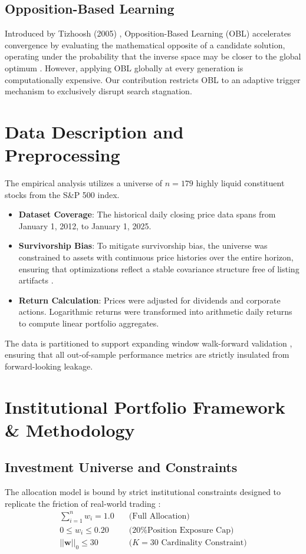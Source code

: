 \documentclass[11pt,a4paper]{article}
\begin{document}
\subsection{Opposition-Based Learning}
Introduced by Tizhoosh (2005) \cite{tizhoosh2005}, Opposition-Based Learning (OBL) accelerates convergence by evaluating the mathematical opposite of a candidate solution, operating under the probability that the inverse space may be closer to the global optimum \cite{rahnamayan2008, chiam2008}. However, applying OBL globally at every generation is computationally expensive. Our contribution restricts OBL to an adaptive trigger mechanism to exclusively disrupt search stagnation.

\section{Data Description and Preprocessing}
The empirical analysis utilizes a universe of $n = 179$ highly liquid constituent stocks from the S\&P 500 index. 
\begin{itemize}
    \item \textbf{Dataset Coverage}: The historical daily closing price data spans from January 1, 2012, to January 1, 2025. 
    \item \textbf{Survivorship Bias}: To mitigate survivorship bias, the universe was constrained to assets with continuous price histories over the entire horizon, ensuring that optimizations reflect a stable covariance structure free of listing artifacts \cite{lo1990}.
    \item \textbf{Return Calculation}: Prices were adjusted for dividends and corporate actions. Logarithmic returns were transformed into arithmetic daily returns to compute linear portfolio aggregates.
\end{itemize}
The data is partitioned to support expanding window walk-forward validation \cite{deprado2018}, ensuring that all out-of-sample performance metrics are strictly insulated from forward-looking leakage.

\section{Institutional Portfolio Framework \& Methodology}

\subsection{Investment Universe and Constraints}
The allocation model is bound by strict institutional constraints designed to replicate the friction of real-world trading \cite{garleanu2013}:
\begin{align}
\sum_{i=1}^{n} w_i = 1.0 \quad &\text{(Full Allocation)} \\
0 \le w_i \le 0.20 \quad &\text{(20\% Position Exposure Cap)} \\
||\mathbf{w}||_0 \le 30 \quad &\text{($K=30$ Cardinality Constraint)}
\end{align}
\end{document}
